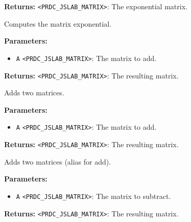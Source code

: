 \documentclass[12pt,a4paper]{article}
\begin{document}
\vspace{5mm}
\noindent {}


\noindent \textbf{Returns:} \texttt{<PRDC\_JSLAB\_MATRIX>}: The exponential matrix.

\noindent Computes the matrix exponential.

\vspace{5mm}
\noindent {}


\noindent \textbf{Parameters:}
\begin{itemize}
  \item \texttt{A} \texttt{<PRDC\_JSLAB\_MATRIX>}: The matrix to add.
\end{itemize}

\noindent \textbf{Returns:} \texttt{<PRDC\_JSLAB\_MATRIX>}: The resulting matrix.

\noindent Adds two matrices.

\vspace{5mm}
\noindent {}


\noindent \textbf{Parameters:}
\begin{itemize}
  \item \texttt{A} \texttt{<PRDC\_JSLAB\_MATRIX>}: The matrix to add.
\end{itemize}

\noindent \textbf{Returns:} \texttt{<PRDC\_JSLAB\_MATRIX>}: The resulting matrix.

\noindent Adds two matrices (alias for add).

\vspace{5mm}
\noindent {}


\noindent \textbf{Parameters:}
\begin{itemize}
  \item \texttt{A} \texttt{<PRDC\_JSLAB\_MATRIX>}: The matrix to subtract.
\end{itemize}

\noindent \textbf{Returns:} \texttt{<PRDC\_JSLAB\_MATRIX>}: The resulting matrix.
\end{document}
